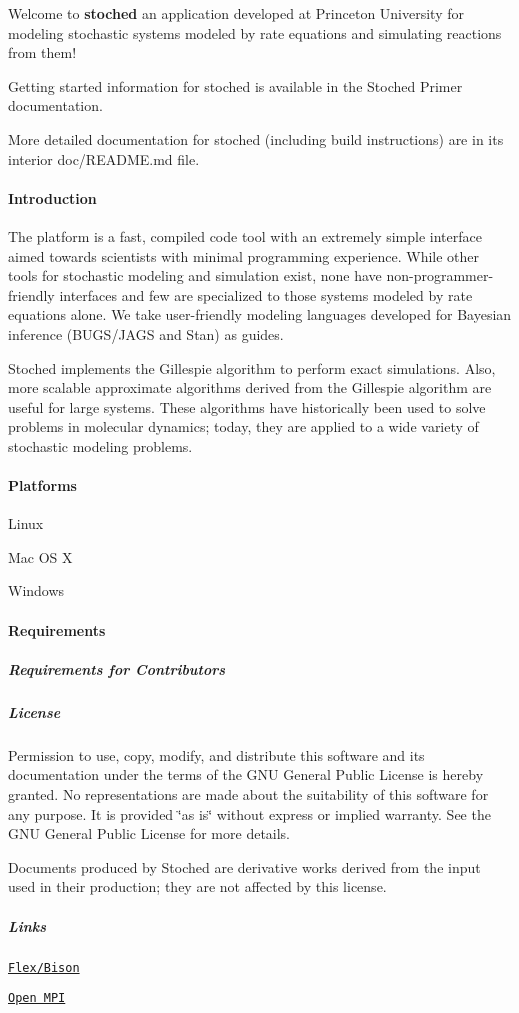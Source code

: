 Welcome to {\bfseries stoched} an application developed at Princeton University for modeling stochastic systems modeled by rate equations and simulating reactions from them!

Getting started information for stoched is available in the Stoched Primer documentation.

More detailed documentation for stoched (including build instructions) are in its interior doc/\+R\+E\+A\+D\+M\+E.\+md file.

\paragraph*{Introduction}

The platform is a fast, compiled code tool with an extremely simple interface aimed towards scientists with minimal programming experience. While other tools for stochastic modeling and simulation exist, none have non-\/programmer-\/friendly interfaces and few are specialized to those systems modeled by rate equations alone. We take user-\/friendly modeling languages developed for Bayesian inference (B\+U\+G\+S/\+J\+A\+GS and Stan) as guides.

Stoched implements the Gillespie algorithm to perform exact simulations. Also, more scalable approximate algorithms derived from the Gillespie algorithm are useful for large systems. These algorithms have historically been used to solve problems in molecular dynamics; today, they are applied to a wide variety of stochastic modeling problems.

\paragraph*{Platforms}


\begin{DoxyItemize}
\item Linux
\item Mac OS X
\item Windows
\end{DoxyItemize}

\paragraph*{Requirements}

\subparagraph*{Requirements for Contributors}

\subparagraph*{License}

Permission to use, copy, modify, and distribute this software and its documentation under the terms of the G\+NU General Public License is hereby granted. No representations are made about the suitability of this software for any purpose. It is provided \char`\"{}as is\char`\"{} without express or implied warranty. See the G\+NU General Public License for more details.

Documents produced by Stoched are derivative works derived from the input used in their production; they are not affected by this license.

\subparagraph*{Links}

\href{https://www.gnu.org/software/bison/}{\tt Flex/\+Bison}

\href{https://www.open-mpi.org/}{\tt Open M\+PI} 